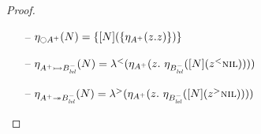 \begin{proof}
\begin{itemize}

\item[--] $\etana{N}{{\ocircle}A^+} 
           = \tlaxr{[N](\tlaxl{\etapa{z}{\tfocusr{z}}{A^+}})}$



\item[--] $\etana{N}{A^+ \lefti B^-_\mlvl}
           = \tlaml{(\etapa{z}{~\etana{[N](\tappl{z}{\tnil})}{B^-_\mlvl}}{A^+})}$
\item[--] $\etana{N}{A^+ \righti B^-_\mlvl}
           = \tlamr{(\etapa{z}{~\etana{[N](\tappr{z}{\tnil})}{B^-_\mlvl}}{A^+})}$





\end{itemize}
\end{proof}
